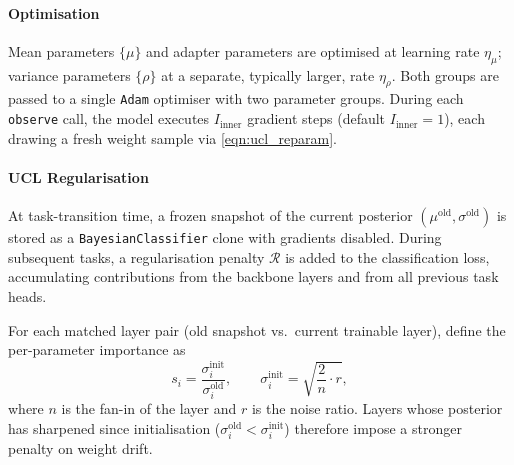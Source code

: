 



\paragraph{Optimisation}

Mean parameters $\{\mu\}$ and adapter parameters are optimised at learning rate $\eta_\mu$; variance parameters $\{\rho\}$ at a separate, typically larger, rate $\eta_\rho$. Both groups are passed to a single \texttt{Adam} optimiser with two parameter groups. During each \texttt{observe} call, the model executes $I_\text{inner}$ gradient steps (default $I_\text{inner}=1$), each drawing a fresh weight sample via \eqref{eqn:ucl_reparam}.

\paragraph{UCL Regularisation}

At task-transition time, a frozen snapshot of the current posterior $(\mu^\text{old}, \sigma^\text{old})$ is stored as a \texttt{BayesianClassifier} clone with gradients disabled. During subsequent tasks, a regularisation penalty $\mathcal{R}$ is added to the classification loss, accumulating contributions from the backbone layers and from all previous task heads.

For each matched layer pair (old snapshot vs.\ current trainable layer), define the per-parameter importance as
%
\begin{equation}\label{eqn:ucl_strength}
    s_i = \frac{\sigma^\text{init}_i}{\sigma^\text{old}_i},
    \qquad
    \sigma^\text{init}_i = \sqrt{\frac{2}{n} \cdot r},
\end{equation}
%
where $n$ is the fan-in of the layer and $r$ is the noise ratio. Layers whose posterior has sharpened since initialisation ($\sigma^\text{old}_i < \sigma^\text{init}_i$) therefore impose a stronger penalty on weight drift.

